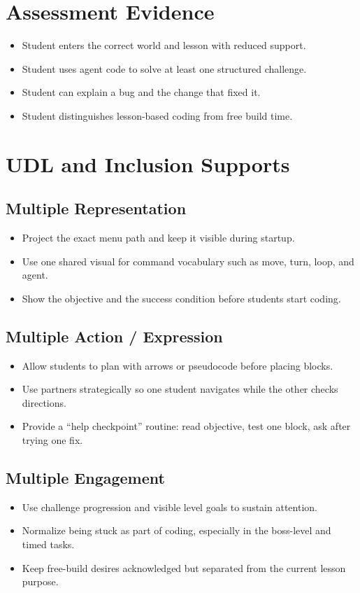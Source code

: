 \documentclass[11pt]{article}
\begin{document}
\section*{Assessment Evidence}
\begin{itemize}[leftmargin=*]
\item Student enters the correct world and lesson with reduced support.
\item Student uses agent code to solve at least one structured challenge.
\item Student can explain a bug and the change that fixed it.
\item Student distinguishes lesson-based coding from free build time.
\end{itemize}

\section*{UDL and Inclusion Supports}
\subsection*{Multiple Representation}
\begin{itemize}[leftmargin=*]
\item Project the exact menu path and keep it visible during startup.
\item Use one shared visual for command vocabulary such as move, turn, loop, and agent.
\item Show the objective and the success condition before students start coding.
\end{itemize}

\subsection*{Multiple Action / Expression}
\begin{itemize}[leftmargin=*]
\item Allow students to plan with arrows or pseudocode before placing blocks.
\item Use partners strategically so one student navigates while the other checks directions.
\item Provide a “help checkpoint” routine: read objective, test one block, ask after trying one fix.
\end{itemize}

\subsection*{Multiple Engagement}
\begin{itemize}[leftmargin=*]
\item Use challenge progression and visible level goals to sustain attention.
\item Normalize being stuck as part of coding, especially in the boss-level and timed tasks.
\item Keep free-build desires acknowledged but separated from the current lesson purpose.
\end{itemize}
\end{document}
